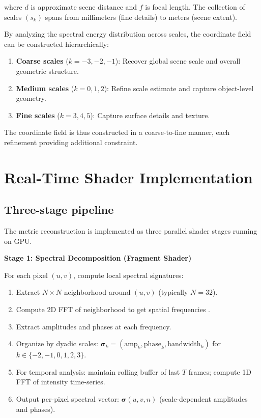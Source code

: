 \documentclass[11pt,twocolumn,a4paper]{article}
\theoremstyle{definition}
\begin{document}
where $d$ is approximate scene distance and $f$ is focal length. The collection of scales $(s_k)$ spans from millimeters (fine details) to meters (scene extent).

By analyzing the spectral energy distribution across scales, the coordinate field can be constructed hierarchically:
\begin{enumerate}[leftmargin=1.4em]
  \item \textbf{Coarse scales} ($k = -3, -2, -1$): Recover global scene scale and overall geometric structure.
  \item \textbf{Medium scales} ($k = 0, 1, 2$): Refine scale estimate and capture object-level geometry.
  \item \textbf{Fine scales} ($k = 3, 4, 5$): Capture surface details and texture.
\end{enumerate}

The coordinate field is thus constructed in a coarse-to-fine manner, each refinement providing additional constraint.

\section{Real-Time Shader Implementation}
\label{sec:algorithm}

\subsection{Three-stage pipeline}

The metric reconstruction is implemented as three parallel shader stages running on GPU.

\textbf{Stage 1: Spectral Decomposition (Fragment Shader)}

For each pixel $(u, v)$, compute local spectral signatures:

\begin{enumerate}[leftmargin=1.4em]
  \item Extract $N \times N$ neighborhood around $(u,v)$ (typically $N=32$).
  \item Compute 2D FFT of neighborhood to get spatial frequencies \citep{press1992,oppenheim1989}.
  \item Extract amplitudes and phases at each frequency.
  \item Organize by dyadic scales: $\bm{\sigma}_k = (\text{amp}_k, \text{phase}_k, \text{bandwidth}_k)$ for $k \in \{-2, -1, 0, 1, 2, 3\}$.
  \item For temporal analysis: maintain rolling buffer of last $T$ frames; compute 1D FFT of intensity time-series.
  \item Output per-pixel spectral vector: $\bm{\sigma}(u,v,n)$ (scale-dependent amplitudes and phases).
\end{enumerate}
\end{document}
